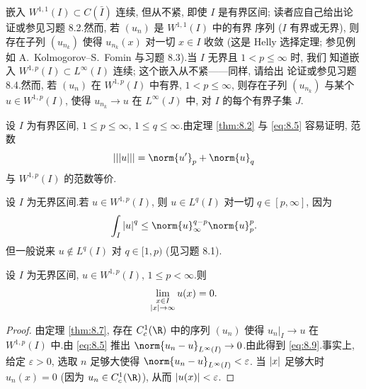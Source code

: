 \begin{remark}
\label{rem:8.10}
嵌入 $W^{1,1}(I)\subset C(\bar I)$ 连续, 但从不紧, 即使 $I$ 是有界区间;
读者应自己给出论证或参见习题 8.2.然而, 若 $(u_n)$ 是 $W^{1,1}(I)$ 中的有界
序列 ($I$ 有界或无界), 则存在子列 $(u_{n_k})$ 使得 $u_{n_k}(x)$ 对一切 $x\in I$
收敛 (这是 Helly 选择定理; 参见例如 A.~Kolmogorov--S.~Fomin
 与习题 8.3).当 $I$ 无界且 $1<p\le\infty$ 时, 我们
知道嵌入 $W^{1,p}(I)\subset L^\infty(I)$ 连续; 这个嵌入从不紧——同样, 请给出
论证或参见习题 8.4.然而, 若 $(u_n)$ 在 $W^{1,p}(I)$ 中有界,
$1<p\le\infty$, 则存在子列 $(u_{n_k})$ 与某个 $u\in W^{1,p}(I)$, 使得
$u_{n_k}\to u$ 在 $L^\infty(J)$ 中, 对 $I$ 的每个有界子集 $J$.
\end{remark}

\begin{remark}
\label{rem:8.11}
设 $I$ 为有界区间, $1\le p\le\infty$, $1\le q\le\infty$.由定理
 \ref{thm:8.2} 与 \eqref{eq:8.5} 容易证明, 范数
\begin{equation*}
|||u|||=\norm{u'}_p+\norm{u}_q
\end{equation*}
与 $W^{1,p}(I)$ 的范数等价.
\end{remark}

\begin{remark}
\label{rem:8.12}
设 $I$ 为无界区间.若 $u\in W^{1,p}(I)$, 则 $u\in L^q(I)$ 对一切
$q\in[p,\infty]$, 因为
\begin{equation*}
\int_I\abs{u}^q\le\norm{u}_\infty^{q-p}\norm{u}_p^p.
\end{equation*}
但一般说来 $u\notin L^q(I)$ 对 $q\in[1,p)$ (见习题 8.1).
\end{remark}

\begin{corollary}
\label{cor:8.9}
设 $I$ 为无界区间, $u\in W^{1,p}(I)$, $1\le p<\infty$.则
\begin{equation}
\lim_{\substack{x\in I\\ \left|x\right|\to\infty}}u(x)=0.
\label{eq:8.9}
\end{equation}
\end{corollary}

\begin{proof}
由定理  \ref{thm:8.7}, 存在 $C_c^1(\R)$ 中的序列 $(u_n)$ 使得
$u_n|_I\to u$ 在 $W^{1,p}(I)$ 中.由 \eqref{eq:8.5} 推出
$\norm{u_n-u}_{L^\infty(I)}\to0$.由此得到 \eqref{eq:8.9}.事实上, 给定
$\varepsilon>0$, 选取 $n$ 足够大使得 $\norm{u_n-u}_{L^\infty(I)}<\varepsilon$.
当 $\left|x\right|$ 足够大时 $u_n(x)=0$ (因为 $u_n\in C_c^1(\R)$), 从而
$\left|u(x)\right|<\varepsilon$.
\end{proof}

